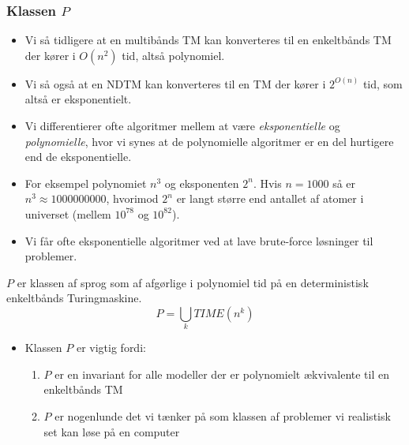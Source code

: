 \begin{frame}[allowframebreaks]
	\frametitle{Klassen $P$}
	\begin{itemize}
		\item Vi så tidligere at en multibånds TM kan konverteres til en enkeltbånds TM der kører i $O(n^{2})$ tid, altså polynomiel.
		\item Vi så også at en NDTM kan konverteres til en TM der kører i $2^{O(n)}$ tid, som altså er eksponentielt.
		\item Vi differentierer ofte algoritmer mellem at være \textit{eksponentielle} og \textit{polynomielle}, hvor vi synes at de polynomielle algoritmer er en del hurtigere end de eksponentielle.
		\item For eksempel polynomiet $n^{3}$ og eksponenten $2^{n}$. Hvis $n = 1000$ så er $n^{3} \approx 1 000 000 000$, hvorimod $2^{n}$ er langt større end antallet af atomer i universet (mellem $10^{78}$ og $10^{82}$).
		\item Vi får ofte eksponentielle algoritmer ved at lave brute-force løsninger til problemer.
	\end{itemize}

	\begin{definition}
		$P$ er klassen af sprog som af afgørlige i polynomiel tid på en deterministisk enkeltbånds Turingmaskine.
		\begin{equation}
			P = \bigcup_k TIME(n^{k})
		\end{equation}
	\end{definition}

	\begin{itemize}
		\item Klassen $P$ er vigtig fordi:
		      \begin{enumerate}
			      \item $P$ er en invariant for alle modeller der er polynomielt ækvivalente til en enkeltbånds TM
			      \item $P$ er nogenlunde det vi tænker på som klassen af problemer vi realistisk set kan løse på en computer
		      \end{enumerate}
	\end{itemize}
\end{frame}


